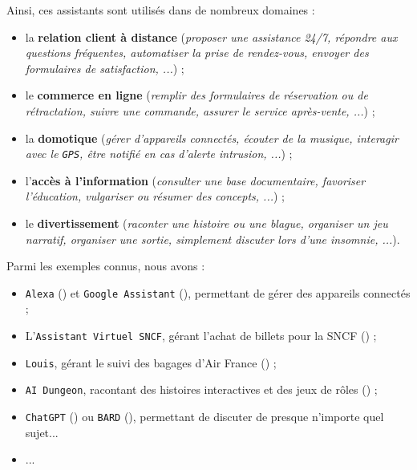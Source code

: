 		
		Ainsi, ces assistants sont utilisés dans de nombreux domaines :
		\begin{itemize}
			\item la \textbf{relation client à distance} (\textit{proposer une assistance 24/7, répondre aux questions fréquentes, automatiser la prise de rendez-vous, envoyer des formulaires de satisfaction, ...}) ;
			\item le \textbf{commerce en ligne} (\textit{remplir des formulaires de réservation ou de rétractation, suivre une commande, assurer le service après-vente, ...}) ;
			\item la \textbf{domotique} (\textit{gérer d'appareils connectés, écouter de la musique, interagir avec le \texttt{GPS}, être notifié en cas d'alerte intrusion, ...}) ;
			\item l'\textbf{accès à l'information} (\textit{consulter une base documentaire, favoriser l'éducation, vulgariser ou résumer des concepts, ...}) ; 
			\item le \textbf{divertissement} (\textit{raconter une histoire ou une blague, organiser un jeu narratif, organiser une sortie, simplement discuter lors d'une insomnie, ...}).
		\end{itemize}
		
		\begin{leftBarExamples}
			Parmi les exemples connus, nous avons :
			\begin{itemize}
				\item \texttt{Alexa} (\cite{alexa-internet:2018:keyword-research-competitor}) et \texttt{Google Assistant} (\cite{google:2016:google-assistant-your}), permettant de gérer des appareils connectés ;
				\item L'\texttt{Assistant Virtuel SNCF}, gérant l'achat de billets pour la SNCF (\cite{sncf:2018:agent-virtuel-sncf}) ;
				\item \texttt{Louis}, gérant le suivi des bagages d'Air France (\cite{air-france:2017:louis}) ;
				\item \texttt{AI Dungeon}, racontant des histoires interactives et des jeux de rôles (\cite{latitude-inc.-oasis-tech-inc.:2019:ai-dungeon}) ;
				\item \texttt{ChatGPT} (\cite{openai:2023:chatgpt}) ou \texttt{BARD} (\cite{google:2023:bard-chat-based}), permettant de discuter de presque n'importe quel sujet...
				\item ...
			\end{itemize}
		\end{leftBarExamples}
	
